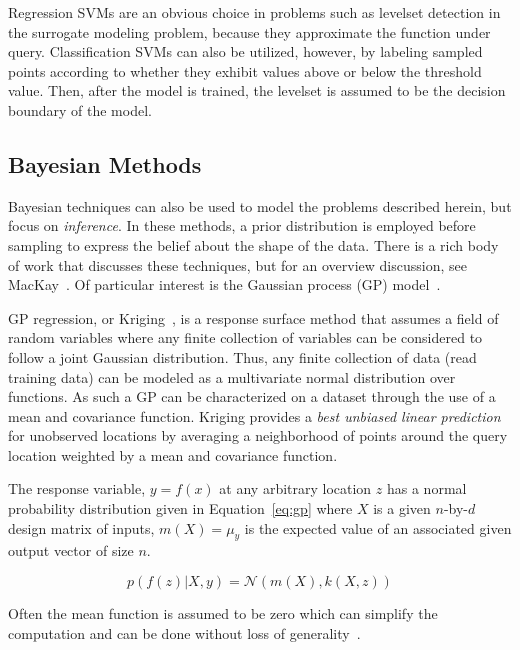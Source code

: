 Regression SVMs are an obvious choice in problems such as levelset detection in the surrogate modeling problem, because they approximate the function under query.
%
Classification SVMs can also be utilized, however, by labeling sampled points according to whether they exhibit values above or below the threshold value.
%
Then, after the model is trained, the levelset is assumed to be the decision boundary of the model.


\subsection{Bayesian Methods}

Bayesian techniques can also be used to model the problems described herein, but focus on \emph{inference}.
%
In these methods, a prior distribution is employed before sampling to express the belief about the shape of the data.
%
There is a rich body of work that discusses these techniques, but for an overview discussion, see MacKay~\cite{MacKay1992b}.
%
Of particular interest is the Gaussian process (GP) model~\cite{RasmussenWilliams2006}.

GP regression, or Kriging~\cite{Stein1999}, is a response surface method that assumes a field of random variables where any finite collection of variables can be considered to follow a joint Gaussian distribution.
%
Thus, any finite collection of data (read training data) can be modeled as a multivariate normal distribution over functions.
%
As such a GP can be characterized on a dataset through the use of a mean and covariance function.
%
Kriging provides a \emph{best unbiased linear prediction} for unobserved locations by averaging a neighborhood of points around the query location weighted by a mean and covariance function.

The response variable, $y=f(x)$ at any arbitrary location $z$ has a normal probability distribution given in Equation~\ref{eq:gp} where $X$ is a given $n$-by-$d$ design matrix of inputs, $m(X) = \mu_y$ is the expected value of an associated given output vector of size $n$.

\begin{equation}
p(f(z)|X,y) = \mathcal{N}(m(X),k(X,z))
\label{eq:gp}
\end{equation}

Often the mean function is assumed to be zero which can simplify the computation and can be done without loss of generality~\cite{Seeger2004}.

